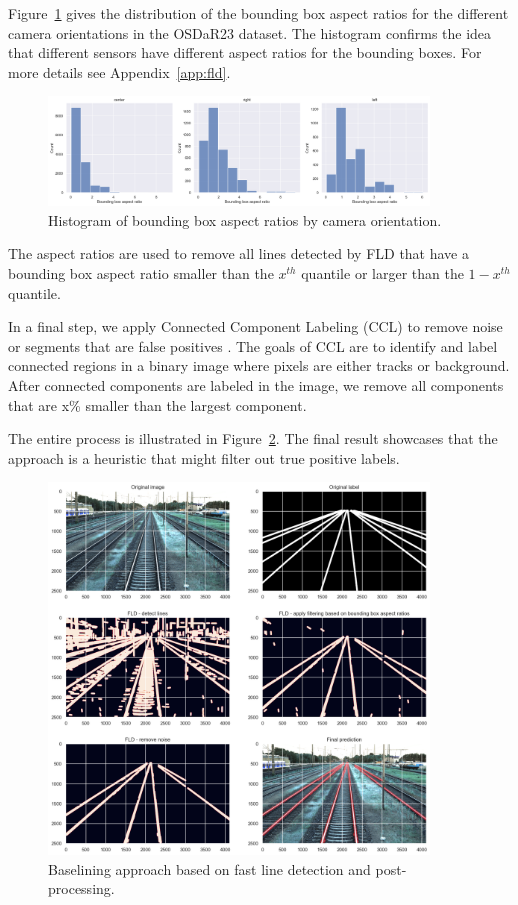 \documentclass[Master,MDS,english]{BASE/twbook} %
\begin{document}
Figure~\ref{fig:bb_aspect_ratio_hist} gives the distribution of the bounding box aspect ratios for the different camera orientations in the OSDaR23 dataset. 
The histogram confirms the idea that different sensors have different aspect ratios for the bounding boxes. For more details see Appendix~\ref{app:fld}.


\begin{figure}[H]
\centering
\includegraphics[width=0.9\textwidth]{images/datasets/db/bb_ascpect_ratio_hist}
\caption{Histogram of bounding box aspect ratios by camera orientation. }
\label{fig:bb_aspect_ratio_hist}
\end{figure}

The aspect ratios are used to remove all lines detected by FLD that have a bounding box aspect ratio smaller than the $x^{th}$ quantile or larger than the $1-x^{th}$ quantile.

In a final step, we apply Connected Component Labeling (CCL) to remove noise or segments that are false positives \citep{CCL}. 
The goals of CCL are to identify and label connected regions in a binary image where pixels are either tracks or background. After connected components are labeled in the image, we remove all components that are x\% smaller than the largest component.

The entire process is illustrated in Figure~\ref{fig:fld_demo}. The final result showcases that the approach is a heuristic that might filter out true positive labels.

\begin{figure}[H]
\centering
\includegraphics[width=0.9\textwidth]{images/fld/fld_demo}
\caption{Baselining approach based on fast line detection and post-processing. }
\label{fig:fld_demo}
\end{figure}
\end{document}
